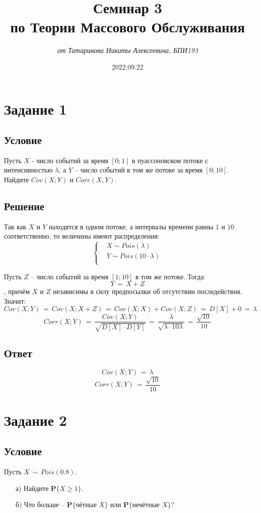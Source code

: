 \documentclass{article}
\title{\textbf{Семинар 3\\по Теории Массового Обслуживания}}
\author{\textit{от Татаринова Никиты Алексеевича, БПИ193}}
\date{2022.09.22}
\begin{document}
\maketitle
\section*{Задание 1}
\subsection*{Условие}
Пусть $ X $ - число событий за время $ [0;1] $ в пуассоновском потоке с интенсивностью $ \lambda $, а $ Y $ -- число событий в том же потоке за время $ [0;10] $. Найдите $ Cov(X;Y) $ и $ Corr(X,Y) $.
\subsection*{Решение}
Так как $ X $ и $ Y $ находятся в одном потоке, а интервалы времени равны $ 1 $ и $ 10 $ соответственно, то величины имеют распределения:
\begin{equation*}
\left\{
\begin{aligned}
& X \! \sim \! Pois(\lambda) \\
& Y \! \sim \! Pois(10 \! \cdot \! \lambda) \\
\end{aligned}
\right.
\end{equation*}\par
Пусть $ Z $ -- число событий за время $ [1;10] $ в том же потоке. Тогда:
\[ Y \, = \, X \! + \! Z \]
, причём $ X $ и $ Z $ независимы в силу предпосылки об отсутствии последействия. Значит:
\[ Cov(X;Y) \, = \, Cov(X;X \! + \! Z) \, = \, Cov(X;X) \! + \! Cov(X;Z) \, = \, D[X] \! + \! 0 \, = \, \lambda \]
\[ Corr(X;Y) \, = \, \dfrac{Cov(X;Y)}{\sqrt{D[X] \! \cdot \! D[Y]}} \, = \, \dfrac{\lambda}{\sqrt{\lambda \! \cdot \! 10 \lambda}} \, = \, \dfrac{\sqrt{10}}{10} \]
\subsection*{Ответ}
\[ Cov(X;Y) \, = \, \lambda \]
\[ Corr(X;Y) \, = \, \dfrac{\sqrt{10}}{10} \]
\section*{Задание 2}
\subsection*{Условие}
Пусть $ X \, \sim \, Pois(0.8) $.
\begin{enumerate}
\item[а)] Найдите $ \mathbf{P} \big\{ X \! \geqslant \! 1 \big\} $.
\item[б)] Что больше -- $ \mathbf{P} \big\{ \text{чётные } X \big\} $ или $ \mathbf{P} \big\{ \text{нечётные } X \big\} $?
\end{enumerate}
\end{document}
